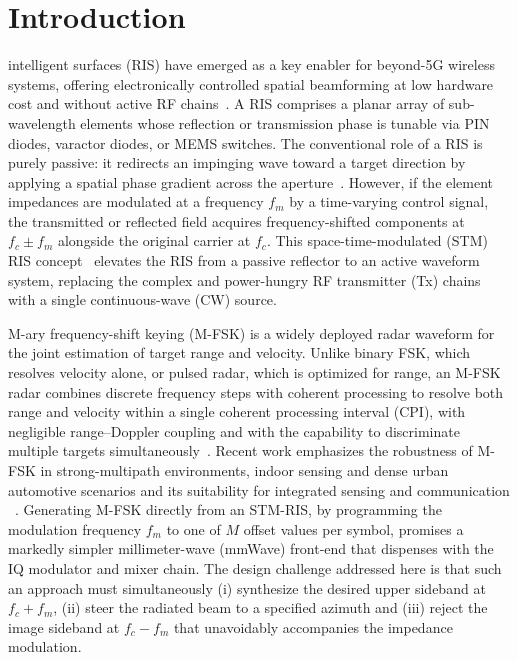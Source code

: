 \documentclass[journal]{IEEEtran}
\begin{document}
\section{Introduction}
 intelligent surfaces (RIS) have emerged as a
key enabler for beyond-5G wireless systems, offering electronically
controlled spatial beamforming at low hardware cost and without active RF
chains~\cite{wu2019towards,basar2019wireless}. A RIS comprises a planar
array of sub-wavelength elements whose reflection or transmission phase is
tunable via PIN diodes, varactor diodes, or MEMS switches. The conventional
role of a RIS is purely passive: it redirects an impinging wave toward a
target direction by applying a spatial phase gradient across the
aperture~\cite{hu2018beyond,marzetta2015massive,liaskos2018new,wu2019intelligent}.
However, if the element impedances are modulated at a frequency $f_m$ by a
time-varying control signal, the transmitted or reflected field acquires
frequency-shifted components at $f_c \pm f_m$ alongside the original carrier
at $f_c$. This space-time-modulated (STM) RIS concept~\cite{zhang2018space}
elevates the RIS from a passive reflector to an active waveform system,
replacing the complex and power-hungry RF transmitter (Tx) chains with a
single continuous-wave (CW) source.

M-ary frequency-shift keying (M-FSK) is a widely deployed radar waveform
for the joint estimation of target range and velocity. Unlike binary FSK,
which resolves velocity alone, or pulsed radar, which is optimized for
range, an M-FSK radar combines discrete frequency steps with coherent
processing to resolve both range and velocity within a single coherent
processing interval (CPI), with negligible range--Doppler coupling and with the capability to discriminate multiple targets
simultaneously~\cite{rohling2001waveform}. Recent work emphasizes the
robustness of M-FSK in strong-multipath environments, indoor sensing and
dense urban automotive scenarios and its suitability for integrated
sensing and communication ~\cite{lu2024integrated}. Generating M-FSK
directly from an STM-RIS, by programming the modulation frequency $f_m$ to
one of $M$ offset values per symbol, promises a markedly simpler
millimeter-wave (mmWave) front-end that dispenses with the IQ modulator and
mixer chain. The design challenge addressed here is that such an approach
must simultaneously (i) synthesize the desired upper sideband at
$f_c + f_m$, (ii) steer the radiated beam to a specified azimuth and
(iii) reject the image sideband at $f_c - f_m$ that unavoidably accompanies
the impedance modulation.
\end{document}
